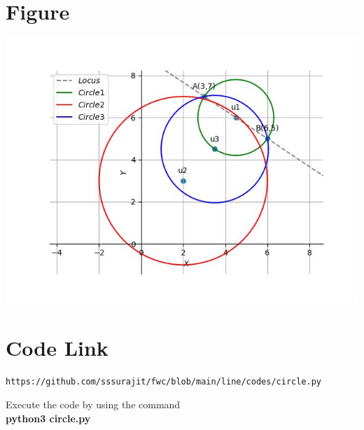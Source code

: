 \documentclass[journal,12pt,twocolumn]{IEEEtran}
\begin{document}
\section{\textbf{Figure}}

    \centering
    \includegraphics[width=\columnwidth]{fig.jpg}
    \label{fig:my_label}
    
\section{\textbf{Code Link}}

\begin{lstlisting}
https://github.com/sssurajit/fwc/blob/main/line/codes/circle.py
\end{lstlisting}
Execute the code by using the command
\\ \textbf{python3 circle.py}
\end{document}
